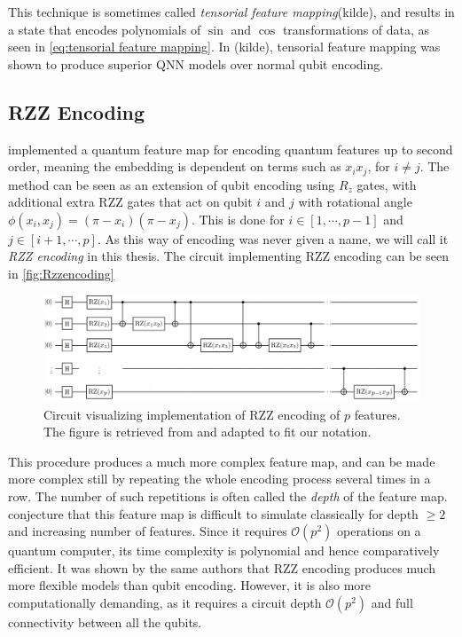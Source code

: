 This technique is sometimes called  \emph{tensorial feature mapping}(kilde), and results in a state that encodes polynomials of $\sin$ and $\cos$ transformations of data, as seen in \autoref{eq:tensorial feature mapping}. In (kilde), tensorial feature mapping was shown to produce superior QNN models over normal qubit encoding. 


\subsection{RZZ Encoding}\label{sec:RZZencoding}
\citet{abbas2020power} implemented a quantum feature map for encoding quantum features up to second order, meaning the embedding is dependent on terms such as $x_i x_j$, for $i\neq j$. The method can be seen as an extension of qubit encoding using $R_z$ gates, with additional extra RZZ gates that act on qubit $i$ and $j$ with rotational angle $\phi(x_i, x_j) = (\pi - x_i)(\pi - x_j)$. This is done for $i\in [1, \cdots, p-1]$ and $j\in [i+1, \cdots, p]$. As this way of encoding was never given a name, we will call it \emph{RZZ encoding} in this thesis. The circuit implementing RZZ encoding can be seen in \autoref{fig:Rzzencoding}

\begin{figure}[H]
    \centering
    \includegraphics[width=14cm]{latex/figures/Rzz_encoding.png}
    \caption{Circuit visualizing implementation of RZZ encoding of $p$ features. The figure is retrieved from \cite{abbas2020power} and adapted to fit our notation.}
    \label{fig:Rzzencoding}
\end{figure}

This procedure produces a much more complex feature map, and can be made more complex still by repeating the whole encoding process several times in a row. The number of such repetitions is often called the \emph{depth} of the feature map.  \citet{abbas2020power} conjecture that this feature map is difficult to simulate classically for depth $\geq 2$ and increasing number of features. Since it requires $\mathcal{O}(p^2)$ operations on a quantum computer, its time complexity is polynomial and hence comparatively efficient. It was shown by the same authors that RZZ encoding produces much more flexible models than qubit encoding. However, it is also more computationally demanding, as it requires a circuit depth $\mathcal{O}(p^2)$ and full connectivity between all the qubits.

